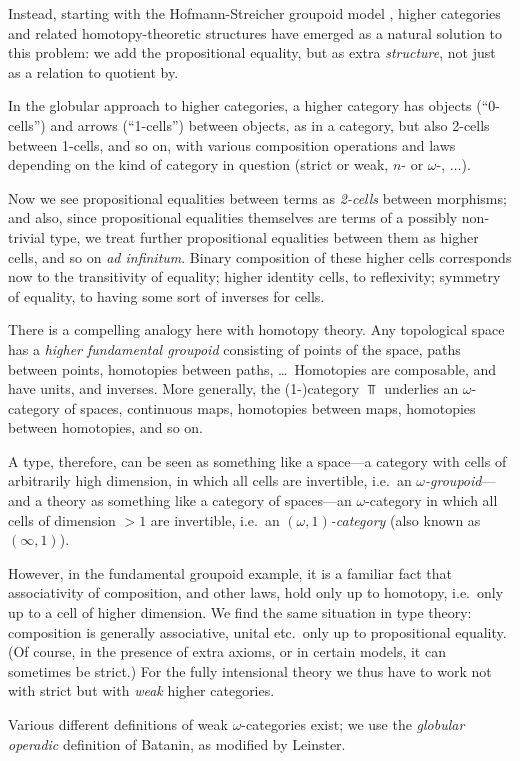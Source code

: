 \begin{para}Instead, starting with the Hofmann-Streicher groupoid model \cite{hofmann-streicher}, higher categories and related homotopy-theoretic structures have emerged as a natural solution to this problem: we add the propositional equality, but as extra \emph{structure}, not just as a relation to quotient by.

In the globular approach to higher categories, a higher category has objects (``0-cells'') and arrows (``1-cells'') between objects, as in a category, but also 2-cells between 1-cells, and so on, with various composition operations and laws depending on the kind of category in question (strict or weak, $n$- or $\omega$-, $\ldots$).

Now we see propositional equalities between terms as \emph{2-cells} between morphisms; and also, since propositional equalities themselves are terms of a possibly non-trivial type, we treat further propositional equalities between them as higher cells, and so on \emph{ad infinitum}.  Binary composition of these higher cells corresponds now to the transitivity of equality; higher identity cells, to reflexivity; symmetry of equality, to having some sort of inverses for cells.

There is a compelling analogy here with homotopy theory.  Any topological space has a \emph{higher fundamental groupoid} consisting of points of the space, paths between points, homotopies between paths, \ldots\ Homotopies are composable, and have units, and inverses.  More generally, the (1-)category $\Top$ underlies an $\omega$-category of spaces, continuous maps, homotopies between maps, homotopies between homotopies, and so on.

A type, therefore, can be seen as something like a space---a category with cells of arbitrarily high dimension, in which all cells are invertible, i.e.\ an \emph{$\omega$-groupoid}---and a theory as something like a category of spaces---an $\omega$-category in which all cells of dimension $> 1$ are invertible, i.e.\ an \emph{$(\omega,1)$-category} (also known as $(\infty,1)$).

However, in the fundamental groupoid example, it is a familiar fact that associativity of composition, and other laws, hold only up to homotopy, i.e.\ only up to a cell of higher dimension.  We find the same situation in type theory: composition is generally associative, unital etc.\ only up to propositional equality.  (Of course, in the presence of extra axioms, or in certain models, it can sometimes be strict.)  For the fully intensional theory we thus have to work not with strict but with \emph{weak} higher categories.

Various different definitions of weak $\omega$-categories exist; we use the \emph{globular operadic} definition of Batanin, as modified by Leinster. 
\end{para}

